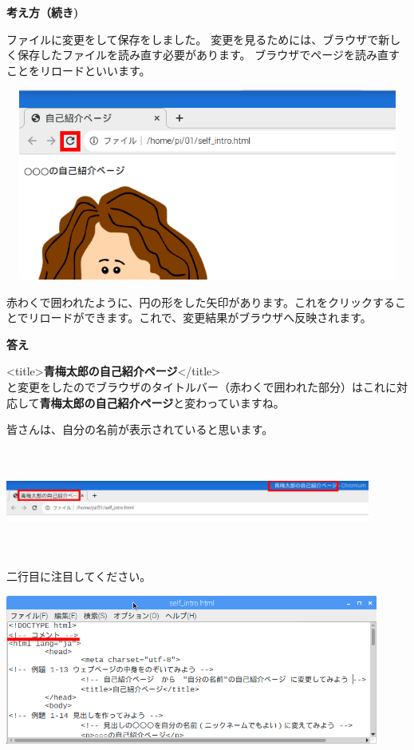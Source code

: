 \documentclass[a4paper,12pt]{jarticle}
\begin{document}
\clearpage
\flushleft
\textbf{考え方（続き)}




ファイルに変更をして保存をしました。
変更を見るためには、ブラウザで新しく保存したファイルを読み直す必要があります。
ブラウザでページを読み直すことをリロードといいます。


\bigskip


\bigskip
\centering
\includegraphics[width=13.665cm,height=6.287cm]{textbook-img149.png}

\flushleft
赤わくで囲われたように、円の形をした矢印があります。これをクリックすることでリロードができます。これで、変更結果がブラウザへ反映されます。

\vfill
\clearpage
\textbf{答え}


{\textless}title{\textgreater}\textbf{青梅太郎の自己紹介ページ}{\textless}/title{\textgreater}\\
と変更をしたのでブラウザのタイトルバー（赤わくで囲われた部分）はこれに対応して\textbf{青梅太郎の自己紹介ページ}と変わっていますね。

皆さんは、自分の名前が表示されていると思います。

\centering
\includegraphics[width=12.006cm,height=3.482cm]{textbook-img152.png}
\flushleft


二行目に注目してください。

\centering
\includegraphics[width=12.273cm,height=4.909cm]{textbook-img151.png}
\flushleft
\end{document}
